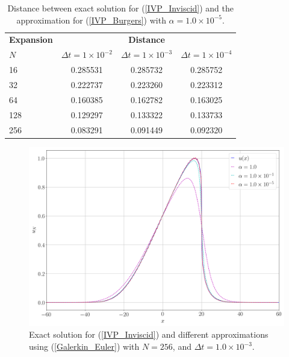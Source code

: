 	\newpage
	\begin{table}[H]
		\centering
		\begin{tabular}{lccc}
			\toprule
			\multicolumn{1}{c}{\hspace{6mm}\textbf{Expansion}} & \multicolumn{3}{c}{\textbf{Distance}} \\
			\hspace{12mm} $N$ & $\Delta t=1\times 10^{-2}$ & $\Delta t=1\times 10^{-3}$ & $\Delta t=1\times 10^{-4}$ \\
			\midrule
			\hspace{12mm} 16 & 0.285531 & 0.285732 & 0.285752 \\
			\midrule
			\hspace{12mm} 32 & 0.222737 & 0.223260 & 0.223312 \\
			\midrule
			\hspace{12mm} 64 & 0.160385 & 0.162782 & 0.163025 \\
			\midrule
			\hspace{12mm} 128 & 0.129297 & 0.133322 & 0.133733 \\
			\midrule
			\hspace{12mm} 256 & 0.083291 & 0.091449 & 0.092320 \\
			\bottomrule
		\end{tabular}
		\caption{Distance between exact solution for (\ref{IVP_Inviscid}) and the approximation for (\ref{IVP_Burgers}) with $\alpha = 1.0 \times 10^{-5}$.}
	\end{table}
	\begin{figure}[H]
		\centering
		\includegraphics[width=12cm]{burgers_equation/deterministic/numerical_experiments/inviscid/figures/varios_alphas.png}
		\caption{Exact solution for (\ref{IVP_Inviscid}) and different approximations using (\ref{Galerkin_Euler}) with $N=256$, and $\Delta t = 1.0 \times 10^{-3}$.}
	\end{figure}